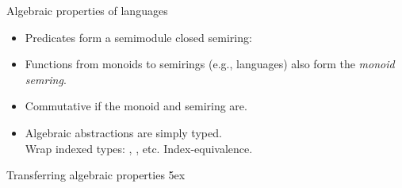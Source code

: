 \documentclass[aspectratio=169]{beamer}
\begin{document}
\begin{frame}{Algebraic properties of languages}
\begin{itemize}\itemsep4ex
\item Predicates form a semimodule closed semiring:
\item Functions from monoids to semirings (e.g., languages) also form the \emph{monoid semring}.
\item Commutative if the monoid and semiring are.
\item Algebraic abstractions are simply typed.\\[2ex]
      Wrap indexed types: { }, { }, etc.
      Index-equivalence.
\end{itemize}
\end{frame}

\rnc{}

\begin{frame}{Transferring algebraic properties}
\vspace{3ex}
\AgdaEmptySkip5ex
\end{frame}
\end{document}
